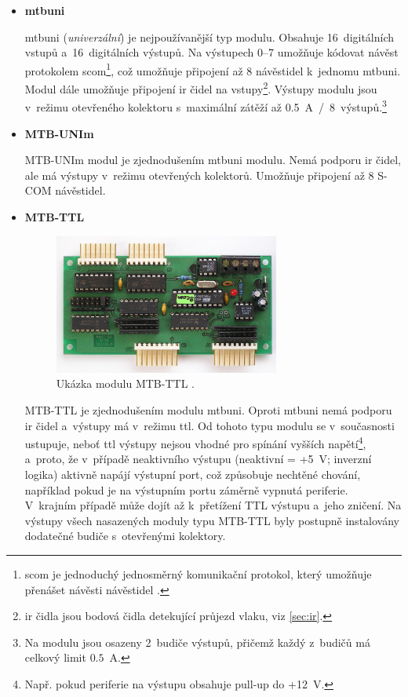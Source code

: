 \begin{itemize}
\item \textbf{\gls{mtbuni}}

	\gls{mtbuni} (\textit{univerzální}) je nejpoužívanější typ modulu. Obsahuje
	16~digitálních vstupů a~16~digitálních výstupů. Na výstupech 0–7 umožňuje
	kódovat návěst protokolem \gls{scom}\footnote{\gls{scom} je jednoduchý jednosměrný
	komunikační protokol, který umožňuje přenášet návěsti návěstidel
	\cite{scom-specs}.}, což umožňuje připojení až 8 návěstidel k~jednomu
	\gls{mtbuni}. Modul dále umožňuje připojení \gls{ir} čidel na
	vstupy\footnote{\gls{ir} čidla jsou bodová čidla detekující průjezd vlaku, viz
	\ref{sec:ir}.}. Výstupy modulu jsou v~režimu otevřeného kolektoru
	s~maximální zátěží až 0.5~A~/~8~výstupů.\footnote{Na modulu jsou osazeny
	2~budiče výstupů, přičemž každý z~budičů má celkový limit $0.5$~A.}

\item \textbf{MTB-UNIm}

	MTB-UNIm modul je zjednodušením \gls{mtbuni} modulu. Nemá podporu \gls{ir}
	čidel, ale má výstupy v~režimu otevřených kolektorů. Umožňuje připojení až
	8 S-COM návěstidel.

\item \textbf{MTB-TTL}

	\begin{figure}[ht]
	\includegraphics[width=0.7\textwidth]{data/mtbttl_foto.jpg}
	\caption{Ukázka modulu MTB-TTL \cite{mtb:web}.}
	\label{fig:mtbttl}
	\end{figure}

	MTB-TTL je zjednodušením modulu \gls{mtbuni}. Oproti \gls{mtbuni}
	nemá podporu \gls{ir} čidel a~výstupy má v~režimu \gls{ttl}. Od tohoto typu
	modulu se v~současnosti ustupuje, neboť \gls{ttl} výstupy nejsou vhodné pro
	spínání vyšších napětí\footnote{Např. pokud periferie na výstupu obsahuje
	pull-up do +12~V.}, a~proto, že v~případě neaktivního výstupu (neaktivní =
	+5~V; inverzní logika) aktivně napájí výstupní port, což způsobuje nechtěné
	chování, například pokud je na výstupním portu záměrně vypnutá periferie.
	V~krajním případě může dojít až k~přetížení TTL výstupu a~jeho zničení. Na
	výstupy všech nasazených moduly typu MTB-TTL byly postupně instalovány
	dodatečné budiče s~otevřenými kolektory.


\end{itemize}
